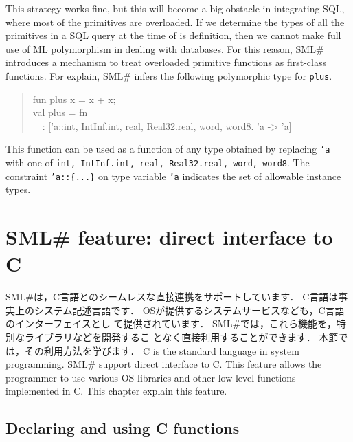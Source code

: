 \documentclass{jbook}
\newcommand{\txt}[2]{#2}
\newcommand{\smlsharp}{SML\#}
\newcommand{\myem}{\mbox{\ \ }}
\begin{document}
	This strategy works fine, but this will become a big obstacle in
integrating SQL, where most of the primitives are overloaded.
	If we determine the types of all the primitives in a SQL query
at the time of is definition, then we cannot make full use of ML
polymorphism in dealing with databases.
	For this reason, \smlsharp{} introduces a mechanism to treat
overloaded primitive functions as first-class functions.
	For explain, \smlsharp{} infers the following polymorphic type
for {\tt plus}.
\begin{tt}
\begin{quote}
fun plus x = x + x;\\
val plus = fn\\
\myem  : ['a::{int, IntInf.int, real, Real32.real, word, word8}. 'a -> 'a]
\end{quote}
\end{tt}
	This function can be used as a function of any type obtained by
replacing {\tt 'a} with one of {\tt int, IntInf.int, real,
Real32.real, word, word8}.
	The constraint {\tt 'a::\{...\}} on type variable {\tt 'a}
indicates the set of allowable instance types.
\fi%


\chapter{
\txt{\smlsharp{}の拡張機能：Cとの直接連携}
    {\smlsharp{} feature: direct interface to C}
}
\label{chap:tutorialCFFI}

\ifjp%
	\smlsharp{}は，C言語とのシームレスな直接連携をサポートしています．
	C言語は事実上のシステム記述言語です．
	OSが提供するシステムサービスなども，C言語のインターフェイスとし
て提供されています．
	\smlsharp{}では，これら機能を，特別なライブラリなどを開発するこ
となく直接利用することができます．
	本節では，その利用方法を学びます．
\else%
	C is the standard language in system programming.
	\smlsharp{} support direct interface to C.
	This feature allows the programmer to use various OS libraries
and other low-level functions implemented in C.
	This chapter explain this feature.
\fi%

\section{\txt{C関数の使用の宣言}{Declaring and using C functions}}
\label{sec:extensionCdecl}
\end{document}
